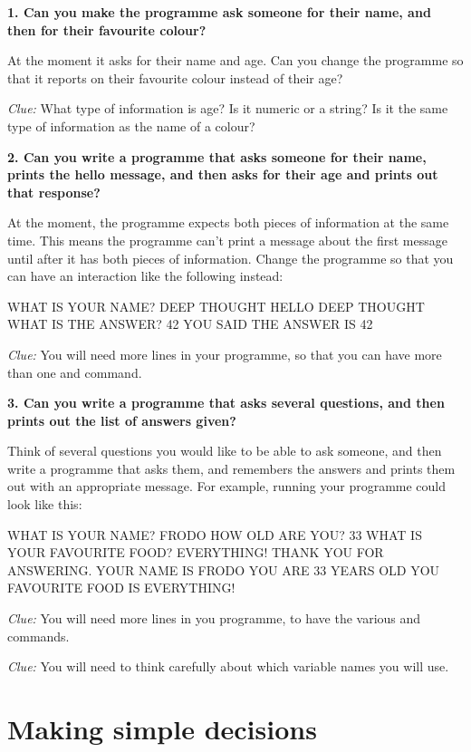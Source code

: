   {\bf 1. Can you make the programme ask someone for their name, and
    then for their favourite colour?}

  At the moment it asks for their name and age. Can you change the
  programme so that it reports on their favourite colour instead of
  their age?

  {\em Clue:} What type of information is age? Is it numeric or a
  string? Is it the same type of information as the name of a colour?

  {\bf 2. Can you write a programme that asks someone for their name,
    prints the hello message, and then asks for their age and prints
    out that response?}

  \needspace{2cm}
  At the moment, the programme expects both pieces of information at
  the same time. This means the programme can't print a message about
  the first message until after it has both pieces of information.
  Change the programme so that you can have an interaction like the
  following instead:

\begin{screenoutput}
WHAT IS YOUR NAME? DEEP THOUGHT
HELLO DEEP THOUGHT
WHAT IS THE ANSWER? 42
YOU SAID THE ANSWER IS 42
\end{screenoutput}

{\em Clue:} You will need more lines in your programme, so that you
can have more than one  and  command.

{\bf 3. Can you write a programme that asks several questions, and
  then prints out the list of answers given?}

\needspace{2cm}
Think of several questions you would like to be able to ask someone,
and then write a programme that asks them, and remembers the answers
and prints them out with an appropriate message. For example, running
your programme could look like this:

\begin{screenoutput}
  WHAT IS YOUR NAME? FRODO
  HOW OLD ARE YOU? 33
  WHAT IS YOUR FAVOURITE FOOD? EVERYTHING!
  THANK YOU FOR ANSWERING.
  YOUR NAME IS FRODO
  YOU ARE 33 YEARS OLD
  YOU FAVOURITE FOOD IS EVERYTHING!
\end{screenoutput}

{\em Clue:} You will need more lines in you programme, to have the
various  and  commands.

{\em Clue:} You will need to think carefully about which variable
names you will use.

\section{Making simple decisions}

